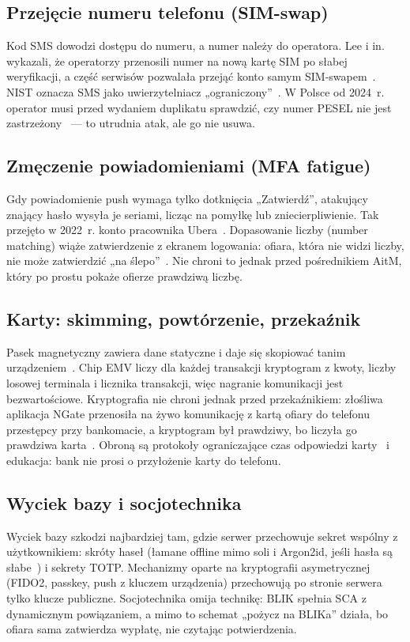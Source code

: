 \documentclass[11pt,a4paper]{article}
\begin{document}
\subsection{Przejęcie numeru telefonu (SIM-swap)}
Kod SMS dowodzi dostępu do numeru, a numer należy do operatora. Lee i in. wykazali, że operatorzy przenosili numer na nową kartę SIM po słabej weryfikacji, a część serwisów pozwalała przejąć konto samym SIM-swapem~\cite{X2}. NIST oznacza SMS jako uwierzytelniacz „ograniczony”~\cite{N1}. W Polsce od 2024~r. operator musi przed wydaniem duplikatu sprawdzić, czy numer PESEL nie jest zastrzeżony~\cite{X8} --- to utrudnia atak, ale go nie usuwa.

\subsection{Zmęczenie powiadomieniami (MFA fatigue)}
Gdy powiadomienie push wymaga tylko dotknięcia „Zatwierdź”, atakujący znający hasło wysyła je seriami, licząc na pomyłkę lub zniecierpliwienie. Tak przejęto w 2022~r. konto pracownika Ubera~\cite{A2}. Dopasowanie liczby (number matching) wiąże zatwierdzenie z ekranem logowania: ofiara, która nie widzi liczby, nie może zatwierdzić „na ślepo”~\cite{X5,X9}. Nie chroni to jednak przed pośrednikiem AitM, który po prostu pokaże ofierze prawdziwą liczbę.

\subsection{Karty: skimming, powtórzenie, przekaźnik}
Pasek magnetyczny zawiera dane statyczne i daje się skopiować tanim urządzeniem~\cite{A7,A8}. Chip EMV liczy dla każdej transakcji kryptogram z kwoty, liczby losowej terminala i licznika transakcji, więc nagranie komunikacji jest bezwartościowe. Kryptografia nie chroni jednak przed przekaźnikiem: złośliwa aplikacja NGate przenosiła na żywo komunikację z kartą ofiary do telefonu przestępcy przy bankomacie, a kryptogram był prawdziwy, bo liczyła go prawdziwa karta~\cite{X6}. Obroną są protokoły ograniczające czas odpowiedzi karty~\cite{A5} i edukacja: bank nie prosi o przyłożenie karty do telefonu.

\subsection{Wyciek bazy i socjotechnika}
Wyciek bazy szkodzi najbardziej tam, gdzie serwer przechowuje sekret wspólny z użytkownikiem: skróty haseł (łamane offline mimo soli i Argon2id, jeśli hasła są słabe~\cite{X3,X4}) i sekrety TOTP. Mechanizmy oparte na kryptografii asymetrycznej (FIDO2, passkey, push z kluczem urządzenia) przechowują po stronie serwera tylko klucze publiczne. Socjotechnika omija technikę: BLIK spełnia SCA z dynamicznym powiązaniem, a mimo to schemat „pożycz na BLIKa” działa, bo ofiara sama zatwierdza wypłatę, nie czytając potwierdzenia.
\end{document}

